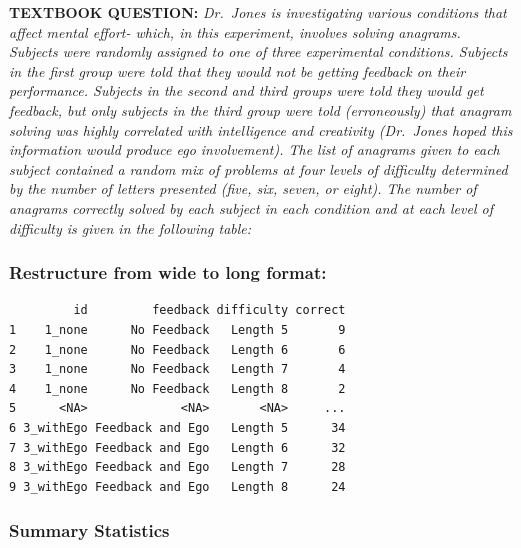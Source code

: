 \documentclass[
]{article}
\begin{document}
\textbf{TEXTBOOK QUESTION:} \emph{Dr.~Jones is investigating various
conditions that affect mental effort- which, in this experiment,
involves solving anagrams. Subjects were randomly assigned to one of
three experimental conditions. Subjects in the first group were told
that they would not be getting feedback on their performance. Subjects
in the second and third groups were told they would get feedback, but
only subjects in the third group were told (erroneously) that anagram
solving was highly correlated with intelligence and creativity
(Dr.~Jones hoped this information would produce ego involvement). The
list of anagrams given to each subject contained a random mix of
problems at four levels of difficulty determined by the number of
letters presented (five, six, seven, or eight). The number of anagrams
correctly solved by each subject in each condition and at each level of
difficulty is given in the following table:}

\hypertarget{restructure-from-wide-to-long-format-1}{%
\subsubsection{Restructure from wide to long
format:}\label{restructure-from-wide-to-long-format-1}}

\begin{verbatim}
         id         feedback difficulty correct
1    1_none      No Feedback   Length 5       9
2    1_none      No Feedback   Length 6       6
3    1_none      No Feedback   Length 7       4
4    1_none      No Feedback   Length 8       2
5      <NA>             <NA>       <NA>     ...
6 3_withEgo Feedback and Ego   Length 5      34
7 3_withEgo Feedback and Ego   Length 6      32
8 3_withEgo Feedback and Ego   Length 7      28
9 3_withEgo Feedback and Ego   Length 8      24
\end{verbatim}

\hypertarget{summary-statistics-1}{%
\subsubsection{Summary Statistics}\label{summary-statistics-1}}
\end{document}
